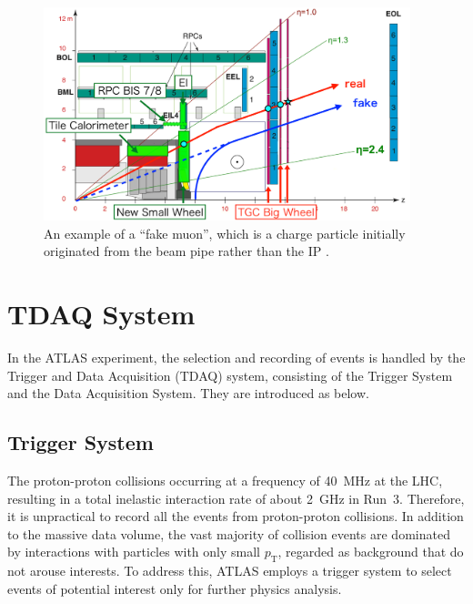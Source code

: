 \begin{figure}[htbp]
  \centering
  \includegraphics[width=0.95\textwidth]{figs/chapter2/InnerCoin_new2.png}
  \caption{An example of a ``fake muon'', which is a charge particle initially originated from the beam pipe rather than the IP \cite{InnerCoinPoster}.}
  \label{fig:InnerCoin}
\end{figure}

\section{TDAQ System} \label{sec:TDAQSystem}
In the ATLAS experiment, the selection and recording of events is handled by the Trigger and Data Acquisition (TDAQ) system, consisting of the Trigger System and the Data Acquisition System. They are introduced as below.
\subsection{Trigger System}
The proton-proton collisions occurring at a frequency of 40~MHz at the LHC, resulting in a total inelastic interaction rate of about 2~GHz in Run~3. Therefore, it is unpractical to record all the events from proton-proton collisions. In addition to the massive data volume, the vast majority of collision events are dominated by interactions with particles with only small $p_{\mathrm{T}}$, regarded as background that do not arouse interests. To address this, ATLAS employs a trigger system to select events of potential interest only for further physics analysis.

